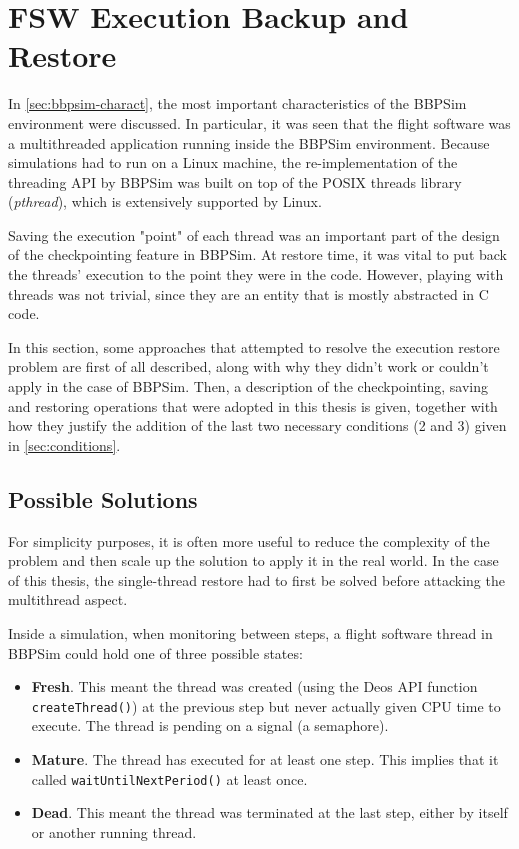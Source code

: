 \section{FSW Execution Backup and Restore}\label{sec:das-exec-restore}
In \autoref{sec:bbpsim-charact}, the most important characteristics of the BBPSim environment were discussed. In particular, it was seen that the flight software was a multithreaded application running inside the \gls{BBPSim} environment. Because simulations had to run on a Linux machine, the re-implementation of the threading API by BBPSim was built on top of the POSIX threads library (\textit{pthread}), which is extensively supported by Linux. 

Saving the execution "point" of each thread was an important part of the design of the checkpointing feature in BBPSim. At restore time, it was vital to put back the threads' execution to the point they were in the code. However, playing with threads was not trivial, since they are an entity that is mostly abstracted in C code.

In this section, some approaches that attempted to resolve the execution restore problem are first of all described, along with why they didn't work or couldn't apply in the case of BBPSim. Then, a description of the checkpointing, saving and restoring operations that were adopted in this thesis is given, together with how they justify the addition of the last two necessary conditions (2 and 3) given in \autoref{sec:conditions}. 

\subsection*{Possible Solutions}
For simplicity purposes, it is often more useful to reduce the complexity of the problem and then scale up the solution to apply it in the real world. In the case of this thesis, the single-thread restore had to first be solved before attacking the multithread aspect. 

Inside a simulation, when monitoring between steps, a flight software thread in BBPSim could hold one of three possible states:
\begin{itemize}
	\item \textbf{Fresh}. This meant the thread was created (using the Deos API function \texttt{createThread()}) at the previous step but never actually given CPU time to execute. The thread is pending on a signal (a semaphore).
	\item \textbf{Mature}. The thread has executed for at least one step. This implies that it called \texttt{waitUntilNextPeriod()} at least once.
	\item \textbf{Dead}. This meant the thread was terminated at the last step, either by itself or another running thread.
\end{itemize}

